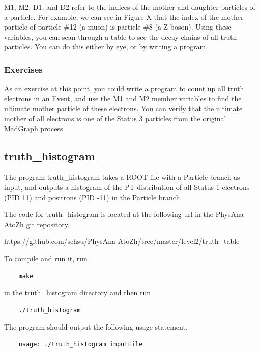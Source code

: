 \documentclass{article}
\begin{document}
\bigskip

M1, M2, D1, and D2 refer to the indices of the mother and daughter particles of a particle. For example, we can see in Figure X that the index of the mother particle of particle \#12 (a muon) is particle \#8 (a Z boson). Using these variables, you can scan through a table to see the decay chains of all truth particles. You can do this either by eye, or by writing a program.

\subsubsection*{Exercises}

As an exercise at this point, you could write a program to count up all truth electrons in an Event, and use the M1 and M2 member variables to find the ultimate mother particle of these electrons. You can verify that the ultimate mother of all electrons is one of the Status 3 particles from the original MadGraph process.

\subsection{truth\_histogram}

The program truth\_histogram takes a ROOT file with a Particle branch as input, and outputs a histogram of the PT distribution of all Status 1 electrons (PID 11) and positrons (PID -11) in the Particle branch.

\bigskip

The code for truth\_histogram is located at the following url in the PhysAna-AtoZh git repository.

\bigskip

\url{https://github.com/schsu/PhysAna-AtoZh/tree/master/level2/truth_table}

\bigskip

To compile and run it, run

\begin{verbatim}
	make
\end{verbatim} 

in the truth\_histogram directory and then run

\begin{verbatim}
	./truth_histogram
\end{verbatim}

The program should output the following usage statement.

\begin{verbatim}
	usage: ./truth_histogram inputFile
\end{verbatim}
\end{document}
